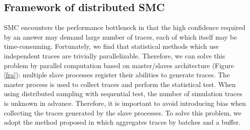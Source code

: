 \subsection{Framework of distributed SMC}
SMC encounters the performance bottleneck in that the high confidence required by an answer may demand large number of traces, each of which itself may be time-consuming. Fortunately, we find that statistical methods which use independent traces are trivially parallelizable. Therefore, we can solve this problem by parallel computation based on master/slaves architecture (Figure \ref{fra}): multiple slave processes register their abilities to generate traces. The master process is used to collect traces and perform the statistical test. When using distributed sampling with sequential test, the number of simulation traces is unknown in advance. Therefore, it is important to avoid introducing bias when collecting the traces generated by the slave processes. To solve this problem, we adopt the method proposed in \cite{Bulychev2012Checking} which aggregates traces by batches and a buffer.
\begin{figure}[htbp]
\end{figure}
